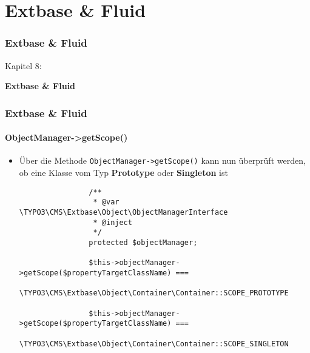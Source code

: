 %

\section{Extbase \& Fluid}
\begin{frame}[fragile]
	\frametitle{Extbase \& Fluid}

	\begin{center}\huge{Kapitel 8:}\end{center}
	\begin{center}\huge{\color{typo3darkgrey}\textbf{Extbase \& Fluid}}\end{center}

\end{frame}


\begin{frame}[fragile]
	\frametitle{Extbase \& Fluid}
	\framesubtitle{ObjectManager->getScope()}

	\lstset{
		basicstyle=\tiny\ttfamily
	}

	\begin{itemize}
		\item Über die Methode \texttt{ObjectManager->getScope()} kann nun überprüft werden, ob eine Klasse vom Typ \textbf{Prototype} oder \textbf{Singleton} ist

			\begin{lstlisting}
				/**
				 * @var \TYPO3\CMS\Extbase\Object\ObjectManagerInterface
				 * @inject
				 */
				protected $objectManager;

				$this->objectManager->getScope($propertyTargetClassName) ===
				  \TYPO3\CMS\Extbase\Object\Container\Container::SCOPE_PROTOTYPE

				$this->objectManager->getScope($propertyTargetClassName) ===
				  \TYPO3\CMS\Extbase\Object\Container\Container::SCOPE_SINGLETON
			\end{lstlisting}

	\end{itemize}

\end{frame}

